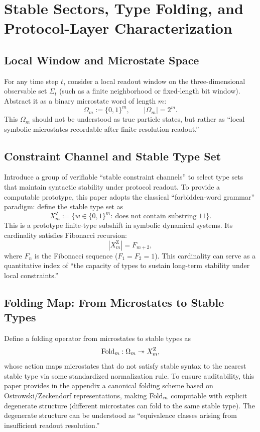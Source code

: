 \section{Stable Sectors, Type Folding, and Protocol-Layer Characterization}

\subsection{Local Window and Microstate Space}

For any time step $t$, consider a local readout window on the three-dimensional observable set $\Sigma_t$ (such as a finite neighborhood or fixed-length bit window). Abstract it as a binary microstate word of length $m$:
\[
\Omega_m:=\{0,1\}^{m},\qquad |\Omega_m|=2^{m}.
\]
This $\Omega_m$ should not be understood as true particle states, but rather as ``local symbolic microstates recordable after finite-resolution readout.''

\subsection{Constraint Channel and Stable Type Set}

Introduce a group of verifiable ``stable constraint channels'' to select type sets that maintain syntactic stability under protocol readout. To provide a computable prototype, this paper adopts the classical ``forbidden-word grammar'' paradigm: define the stable type set as
\[
X_m^{\mathrm Z}:=\Big\{w\in\{0,1\}^{m}:\ \text{does not contain substring }11\Big\}.
\]
This is a prototype finite-type subshift in symbolic dynamical systems. Its cardinality satisfies Fibonacci recursion:
\[
|X_m^{\mathrm Z}|=F_{m+2},
\]
where $F_{n}$ is the Fibonacci sequence ($F_1=F_2=1$). This cardinality can serve as a quantitative index of ``the capacity of types to sustain long-term stability under local constraints.''

\subsection{Folding Map: From Microstates to Stable Types}

Define a folding operator from microstates to stable types as
\[
\mathrm{Fold}_m:\Omega_m \twoheadrightarrow X_m^{\mathrm Z},
\]
whose action maps microstates that do not satisfy stable syntax to the nearest stable type via some standardized normalization rule. To ensure auditability, this paper provides in the appendix a canonical folding scheme based on Ostrowski/Zeckendorf representations, making $\mathrm{Fold}_m$ computable with explicit degenerate structure (different microstates can fold to the same stable type). The degenerate structure can be understood as ``equivalence classes arising from insufficient readout resolution.''

